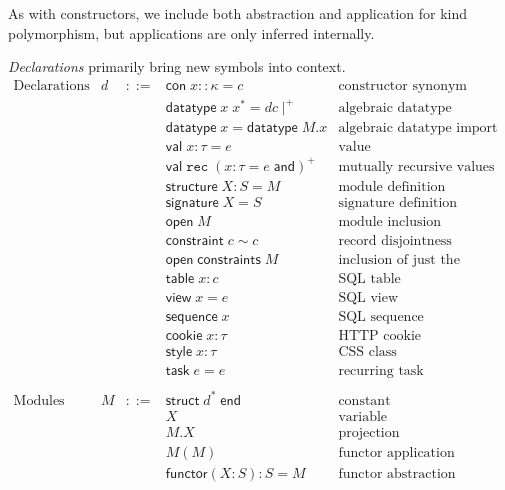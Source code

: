 \documentclass{article}
\newcommand{\cd}[1]{\texttt{#1}}
\newcommand{\mt}[1]{\mathsf{#1}}
\begin{document}
As with constructors, we include both abstraction and application for kind polymorphism, but applications are only inferred internally.

\emph{Declarations} primarily bring new symbols into context.
$$\begin{array}{rrcll}
  \textrm{Declarations} & d &::=& \mt{con} \; x :: \kappa = c & \textrm{constructor synonym} \\
  &&& \mt{datatype} \; x \; x^* = dc\mid^+ & \textrm{algebraic datatype definition} \\
  &&& \mt{datatype} \; x = \mt{datatype} \; M.x & \textrm{algebraic datatype import} \\
  &&& \mt{val} \; x : \tau = e & \textrm{value} \\
  &&& \mt{val} \; \cd{rec} \; (x : \tau = e \; \mt{and})^+ & \textrm{mutually recursive values} \\
  &&& \mt{structure} \; X : S = M & \textrm{module definition} \\
  &&& \mt{signature} \; X = S & \textrm{signature definition} \\
  &&& \mt{open} \; M & \textrm{module inclusion} \\
  &&& \mt{constraint} \; c \sim c & \textrm{record disjointness constraint} \\
  &&& \mt{open} \; \mt{constraints} \; M & \textrm{inclusion of just the constraints from a module} \\
  &&& \mt{table} \; x : c & \textrm{SQL table} \\
  &&& \mt{view} \; x = e & \textrm{SQL view} \\
  &&& \mt{sequence} \; x & \textrm{SQL sequence} \\
  &&& \mt{cookie} \; x : \tau & \textrm{HTTP cookie} \\
  &&& \mt{style} \; x : \tau & \textrm{CSS class} \\
  &&& \mt{task} \; e = e & \textrm{recurring task} \\
  \\
  \textrm{Modules} & M &::=& \mt{struct} \; d^* \; \mt{end} & \textrm{constant} \\
  &&& X & \textrm{variable} \\
  &&& M.X & \textrm{projection} \\
  &&& M(M) & \textrm{functor application} \\
  &&& \mt{functor}(X : S) : S = M & \textrm{functor abstraction} \\
\end{array}$$
\end{document}

